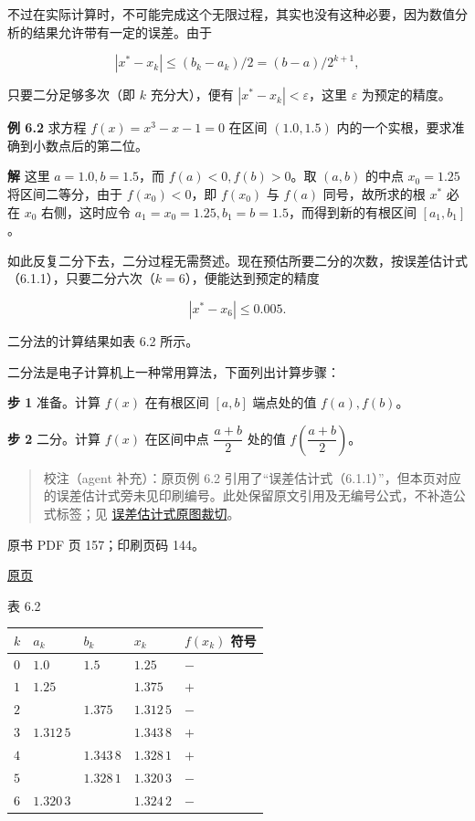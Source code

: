 不过在实际计算时，不可能完成这个无限过程，其实也没有这种必要，因为数值分析的结果允许带有一定的误差。由于

\[
|x^*-x_k|\leqslant(b_k-a_k)/2=(b-a)/2^{k+1},
\]

只要二分足够多次（即 \(k\) 充分大），便有 \(|x^*-x_k|<\varepsilon\)，这里 \(\varepsilon\) 为预定的精度。

\textbf{例 6.2} 求方程 \(f(x)=x^3-x-1=0\) 在区间 \((1.0,1.5)\) 内的一个实根，要求准确到小数点后的第二位。

\textbf{解} 这里 \(a=1.0,b=1.5\)，而 \(f(a)<0,f(b)>0\)。取 \((a,b)\) 的中点 \(x_0=1.25\) 将区间二等分，由于 \(f(x_0)<0\)，即 \(f(x_0)\) 与 \(f(a)\) 同号，故所求的根 \(x^*\) 必在 \(x_0\) 右侧，这时应令 \(a_1=x_0=1.25,b_1=b=1.5\)，而得到新的有根区间 \([a_1,b_1]\)。

如此反复二分下去，二分过程无需赘述。现在预估所要二分的次数，按误差估计式（6.1.1），只要二分六次（\(k=6\)），便能达到预定的精度

\[
|x^*-x_6|\leqslant0.005.
\]

二分法的计算结果如表 6.2 所示。

二分法是电子计算机上一种常用算法，下面列出计算步骤：

\textbf{步 1} 准备。计算 \(f(x)\) 在有根区间 \([a,b]\) 端点处的值 \(f(a),f(b)\)。

\textbf{步 2} 二分。计算 \(f(x)\) 在区间中点 \(\dfrac{a+b}{2}\) 处的值 \(f\left(\dfrac{a+b}{2}\right)\)。

\begin{quote}
校注（agent 补充）：原页例 6.2 引用了``误差估计式（6.1.1）''，但本页对应的误差估计式旁未见印刷编号。此处保留原文引用及无编号公式，不补造公式标签；见 \href{verified/assets/ch06/detail-p156-audit.png}{误差估计式原图裁切}。
\end{quote}

\clearpage

原书 PDF 页 157；印刷页码 144。

\href{source-images/pdf-157.jpeg}{原页}

表 6.2

{\def\LTcaptype{none} %
\begin{longtable}[]{@{}lllll@{}}
\toprule\noalign{}
\(k\) & \(a_k\) & \(b_k\) & \(x_k\) & \(f(x_k)\) 符号 \\
\midrule\noalign{}
\endhead
\bottomrule\noalign{}
\endlastfoot
\(0\) & \(1.0\) & \(1.5\) & \(1.25\) & \(-\) \\
\(1\) & \(1.25\) & & \(1.375\) & \(+\) \\
\(2\) & & \(1.375\) & \(1.312\,5\) & \(-\) \\
\(3\) & \(1.312\,5\) & & \(1.343\,8\) & \(+\) \\
\(4\) & & \(1.343\,8\) & \(1.328\,1\) & \(+\) \\
\(5\) & & \(1.328\,1\) & \(1.320\,3\) & \(-\) \\
\(6\) & \(1.320\,3\) & & \(1.324\,2\) & \(-\) \\
\end{longtable}
}

